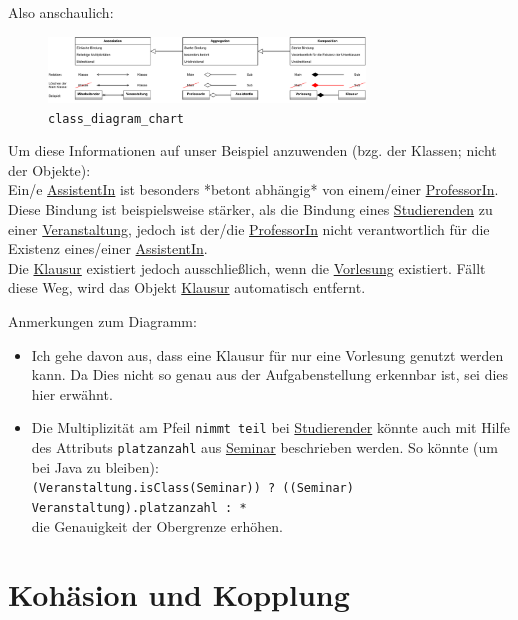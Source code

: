 \documentclass{article}
\begin{document}
    Also anschaulich:
    \begin{figure}[ht]
        \centering
        \includegraphics[width=0.75\textwidth]{swt_wende_tim_h07_class_diagram_chart.pdf}
        \caption{\texttt{class\_diagram\_chart}}
    \end{figure}

    Um diese Informationen auf unser Beispiel anzuwenden (bzg. der Klassen; nicht der Objekte):\\
    Ein/e \underline{AssistentIn} ist besonders *betont abhängig* von einem/einer \underline{ProfessorIn}.
    Diese Bindung ist beispielsweise stärker, als die Bindung eines \underline{Studierenden} zu einer \underline{Veranstaltung}, jedoch ist der/die \underline{ProfessorIn} nicht verantwortlich für die Existenz eines/einer \underline{AssistentIn}.\\
    Die \underline{Klausur} existiert jedoch ausschließlich, wenn die \underline{Vorlesung} existiert.
    Fällt diese Weg, wird das Objekt \underline{Klausur} automatisch entfernt.

    \vspace{1em}
    Anmerkungen zum Diagramm:
    \begin{itemize}
        \item Ich gehe davon aus, dass eine Klausur für nur eine Vorlesung genutzt werden kann.
            Da Dies nicht so genau aus der Aufgabenstellung erkennbar ist, sei dies hier erwähnt.
        \item Die Multiplizität am Pfeil \texttt{nimmt teil} bei \underline{Studierender} könnte auch mit Hilfe des Attributs \texttt{platzanzahl} aus \underline{Seminar} beschrieben werden.
            So könnte (um bei Java zu bleiben):\\
            \texttt{(Veranstaltung.isClass(Seminar)) ? ((Seminar) Veranstaltung).platzanzahl : *}\\
            die Genauigkeit der Obergrenze erhöhen.
    \end{itemize}

    \newpage
    \section*{Kohäsion und Kopplung}
\end{document}
